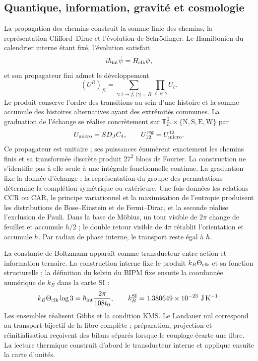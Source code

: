 \subsection*{Quantique, information, gravité et cosmologie}

La propagation des chemins construit la somme finie des chemins, la
représentation Clifford--Dirac et l'évolution de Schrödinger. Le
Hamiltonien du calendrier interne étant fixé, l'évolution satisfait
\[
 i\hbar_{\rm int}\dot\psi=H_{\rm clk}\psi,
\]
et son propagateur fini admet le développement
\[
 (U^R)_{fi}=
 \sum_{\gamma:i\to f,\,|\gamma|=R}
 \prod_{\ell\in\gamma}U_\ell.
\]
Le produit conserve l'ordre des transitions au sein d'une histoire et
la somme accumule des histoires alternatives ayant des extrémités communes. La graduation
de l'échange se réalise concrètement sur
\(\mathbb T_{27}^{\,2}\times\{\mathrm N,\mathrm S,\mathrm E,\mathrm W\}\)
par
\[
 U_{\rm micro}=S D_J C_4,
 \qquad U_{12}^{\rm reg}=U_{\rm micro}^{12}.
\]
Ce propagateur est unitaire ; ses puissances énumèrent exactement les chemins
finis et sa transformée discrète produit \(27^2\) blocs de Fourier. La
construction ne s'identifie pas à elle seule à une intégrale fonctionnelle
continue. La graduation fixe la donnée d'échange ; la représentation du
groupe des permutations détermine la complétion symétrique ou extérieure. Une fois
données les relations CCR ou CAR, le principe variationnel et la maximisation
de l'entropie produisent les
distributions de Bose--Einstein et de Fermi--Dirac, et la seconde réalise
l'exclusion de Pauli. Dans la base de Möbius, un tour visible de \(2\pi\) change
de feuillet et accumule \(h/2\) ; le double retour visible de \(4\pi\) rétablit
l'orientation et accumule \(h\). Par radian de phase interne, le transport
reste égal à \(\hbar\).

La constante de Boltzmann apparaît comme transducteur entre action et information
ternaire. La construction interne fixe le produit
\(k_B\Theta_{\rm clk}\) et sa fonction structurelle ; la définition du kelvin
du BIPM fixe ensuite la coordonnée numérique de \(k_B\) dans la carte SI :
\[
 k_B\Theta_{\rm clk}\log3=\hbar_{\rm int}\frac{2\pi}{108t_0},
 \qquad
 k_B^{\rm SI}=1.380649\times10^{-23}\ \mathrm{J\,K^{-1}}.
\]
Les ensembles réalisent Gibbs et la condition KMS. Le Landauer nul correspond
au transport bijectif de la fibre complète ; préparation, projection et
réinitialisation reçoivent des bilans séparés lorsque le couplage écarte une
fibre. La lecture thermique construit d'abord le transducteur interne et applique
ensuite la carte d'unités.

